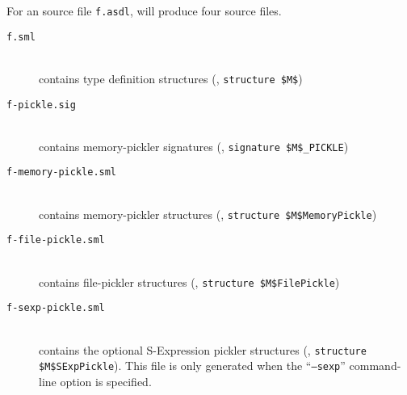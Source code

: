 For an \asdl{} source file \texttt{f.asdl}, \asdlgen{} will produce four \sml{} source files.
\begin{description}
  \item[\normalfont\texttt{f.sml}] \mbox{}\\
    contains type definition structures (\eg{},
    \lstinline[mathescape=true]@structure $M$@)
  \item[\normalfont\texttt{f-pickle.sig}] \mbox{}\\
    contains memory-pickler signatures (\eg{},
    \lstinline[mathescape=true]@signature $M$_PICKLE@)
  \item[\normalfont\texttt{f-memory-pickle.sml}] \mbox{}\\
    contains memory-pickler structures (\eg{},
    \lstinline[mathescape=true]@structure $M$MemoryPickle@)
  \item[\normalfont\texttt{f-file-pickle.sml}] \mbox{}\\
    contains file-pickler structures (\eg{},
    \lstinline[mathescape=true]@structure $M$FilePickle@)
  \item[\normalfont\texttt{f-sexp-pickle.sml}] \mbox{}\\
    contains the optional S-Expression pickler structures (\eg{},
    \lstinline[mathescape=true]@structure $M$SExpPickle@).
    This file is only generated when the ``\texttt{--sexp}''
    command-line option is specified.
\end{description}%

